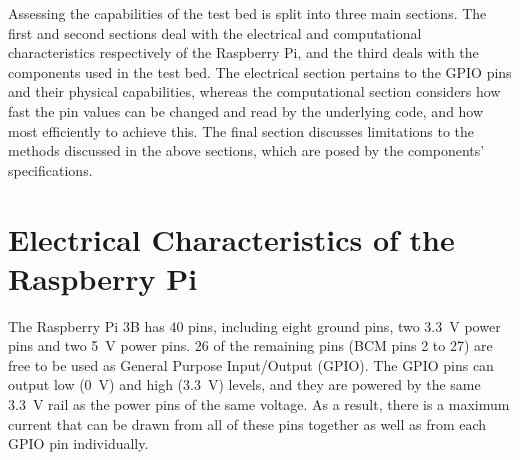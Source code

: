 \documentclass[../main.tex]{subfiles}
\begin{document}
Assessing the capabilities of the test bed is split into three main sections.
The first and second sections deal with the electrical and computational characteristics respectively of the Raspberry Pi, and the third deals with the components used in the test bed.
The electrical section pertains to the GPIO pins and their physical capabilities, whereas the computational section considers how fast the pin values can be changed and read by the underlying code, and how most efficiently to achieve this.
The final section discusses limitations to the methods discussed in the above sections, which are posed by the components' specifications.\\


\section{Electrical Characteristics of the Raspberry Pi}

The Raspberry Pi 3B has 40 pins, including eight ground pins, two \SI{3.3}{\volt} power pins and two \SI{5}{\volt} power pins.
26 of the remaining pins (BCM pins 2 to 27) are free to be used as General Purpose Input/Output (GPIO).
The GPIO pins can output low (\SI{0}{\volt}) and high (\SI{3.3}{\volt}) levels, and they are powered by the same \SI{3.3}{\volt} rail as the power pins of the same voltage.
As a result, there is a maximum current that can be drawn from all of these pins together as well as from each GPIO pin individually.\\
\end{document}
